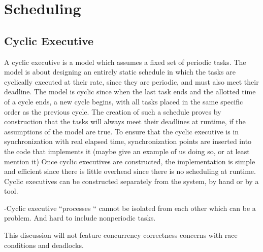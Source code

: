 \section{Scheduling}
\label{sec:Scheduling}


\subsection{Cyclic Executive}
\label{sec:Cyclic Executive}
A cyclic executive is a model which assumes a fixed set of periodic tasks. The model is about designing an entirely static schedule in which the tasks are cyclically executed at their rate, since they are periodic, and must also meet their deadline. The model is cyclic since when the last task ends and the allotted time of a cycle ends, a new cycle begins, with all tasks placed in the same specific order as the previous cycle. The creation of such a schedule proves by construction that the tasks will always meet their deadlines at runtime, if the assumptions of the model are true. \newline
To ensure that the cyclic executive is in synchronization with real elapsed time, synchronization points are inserted into the code that implements it (maybe give an example of us doing so, or at least mention it)
Once cyclic executives are constructed, the implementation is simple and efficient since there is little overhead since there is no scheduling at runtime. Cyclic executives can be constructed separately from the system, by hand or by a tool.

-Cyclic executive “processes “ cannot be isolated from each other which can be a problem. And hard to include nonperiodic tasks.

This discussion will not feature concurrency correctness concerns with race conditions and deadlocks.

